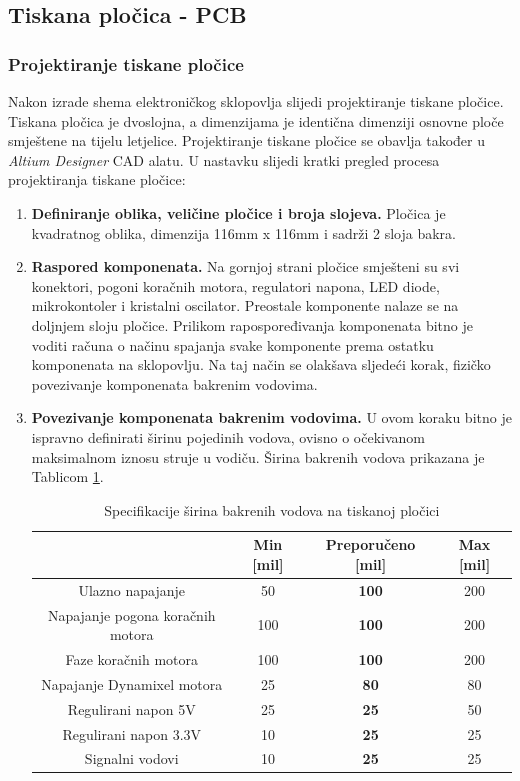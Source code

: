 \documentclass[11pt,a4paper]{article}
\begin{document}
\subsection{Tiskana pločica - PCB}

\subsubsection{Projektiranje tiskane pločice}
Nakon izrade shema elektroničkog sklopovlja slijedi projektiranje tiskane pločice. Tiskana pločica je dvoslojna, a dimenzijama je identična dimenziji osnovne ploče smještene na tijelu letjelice. Projektiranje tiskane pločice se obavlja također u \textit{Altium Designer} CAD alatu. U nastavku slijedi kratki pregled procesa projektiranja tiskane pločice:

\begin{center}
	\begin{enumerate}
		\item \textbf{Definiranje oblika, veličine pločice i broja slojeva.} Pločica je kvadratnog oblika, dimenzija 116mm x 116mm i sadrži 2 sloja bakra.
		
		\item \textbf{Raspored komponenata.} Na gornjoj strani pločice smješteni su svi konektori, pogoni koračnih motora, regulatori napona, LED diode, mikrokontoler i kristalni oscilator. Preostale komponente nalaze se na doljnjem sloju pločice. Prilikom rapospoređivanja komponenata bitno je voditi računa o načinu spajanja svake komponente prema ostatku komponenata na sklopovlju. Na taj način se olakšava sljedeći korak, fizičko povezivanje komponenata bakrenim vodovima.
		
		\item \textbf{Povezivanje komponenata bakrenim vodovima.} U ovom koraku bitno je ispravno definirati širinu pojedinih vodova, ovisno o očekivanom maksimalnom iznosu struje u vodiču. Širina bakrenih vodova prikazana je Tablicom \ref{tab:specifikacija_pcb_with}.

\begin{table}[H]
	\centering
	\caption{Specifikacije širina bakrenih vodova na tiskanoj pločici}
	\label{tab:specifikacija_pcb_with}
	\begin{tabular}{|c|c|c|c|}
			\hline 
		  					& \textbf{Min [mil]} 	& \textbf{Preporučeno [mil]}	& \textbf{Max [mil]} \\ \hline  \hline
		 Ulazno napajanje 	& 50 	& \textbf{100} 			& 200 \\ \hline
		 Napajanje pogona koračnih motora 	& 100 	& \textbf{100} 			& 200 \\ \hline
		 Faze koračnih motora 	& 100 	& \textbf{100} 			& 200 \\ \hline
		 Napajanje Dynamixel motora 	& 25 	& \textbf{80} 			& 80 \\ \hline
		 Regulirani napon 5V 	& 25 	& \textbf{25} 			& 50 \\ \hline
		 Regulirani napon 3.3V 	& 10 	& \textbf{25} 			& 25 \\ \hline
		 Signalni vodovi 	& 10 	& \textbf{25}			& 25 \\ \hline
	\end{tabular}
\end{table}		


\end{enumerate}
\end{center}
\end{document}
